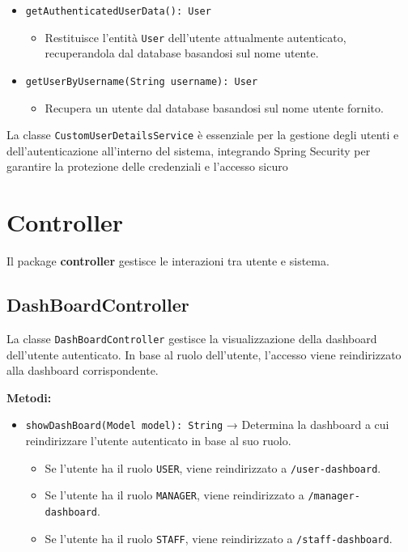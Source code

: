 \documentclass[twoside,openright,titlepage,fleqn,headinclude,12pt,a4paper,BCOR=5mm,footinclude]{scrbook}
\begin{document}
\begin{itemize}
    \item \texttt{getAuthenticatedUserData(): User}  
    \begin{itemize}  
        \item Restituisce l'entità \texttt{User} dell'utente attualmente autenticato, recuperandola dal database basandosi sul nome utente.  
    \end{itemize}  

    \item \texttt{getUserByUsername(String username): User}  
    \begin{itemize}  
        \item Recupera un utente dal database basandosi sul nome utente fornito.  
    \end{itemize}  
\end{itemize}  

La classe \texttt{CustomUserDetailsService} è essenziale per la gestione degli utenti e dell'autenticazione all'interno del sistema, integrando Spring Security per garantire la protezione delle credenziali e l'accesso sicuro





\section{Controller}

Il package \textbf{controller} gestisce le interazioni tra utente e sistema.  
\subsection{DashBoardController}
La classe \texttt{DashBoardController} gestisce la visualizzazione della dashboard dell'utente autenticato. In base al ruolo dell'utente, l’accesso viene reindirizzato alla dashboard corrispondente.  

\textbf{Metodi:}  
\begin{itemize}  
    \item \texttt{showDashBoard(Model model): String} → Determina la dashboard a cui reindirizzare l'utente autenticato in base al suo ruolo.  
    \begin{itemize}
        \item Se l'utente ha il ruolo \texttt{USER}, viene reindirizzato a \texttt{/user-dashboard}.  
        \item Se l'utente ha il ruolo \texttt{MANAGER}, viene reindirizzato a \texttt{/manager-dashboard}.  
        \item Se l'utente ha il ruolo \texttt{STAFF}, viene reindirizzato a \texttt{/staff-dashboard}. 
    \end{itemize}
\end{itemize}  
\end{document}
